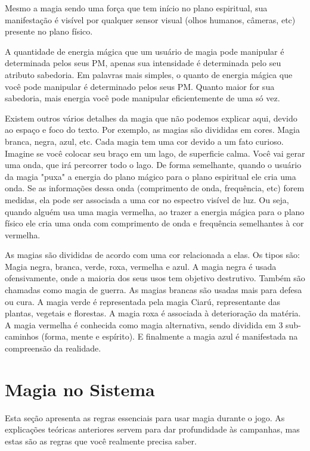 Mesmo a magia sendo uma força que tem início no plano espiritual, sua manifestação é visível por qualquer sensor visual (olhos humanos, câmeras, etc) presente no plano físico.

A quantidade de energia mágica que um usuário de magia pode manipular é determinada pelos seus PM, apenas sua intensidade é determinada pelo seu atributo sabedoria. Em palavras mais simples, o quanto de energia mágica que você pode manipular é determinado pelos seus PM. Quanto maior for sua sabedoria, mais energia você pode manipular eficientemente de uma só vez.

Existem outros vários detalhes da magia que não podemos explicar aqui, devido ao espaço e foco do texto. Por exemplo, as magias são divididas em cores. Magia branca, negra, azul, etc. Cada magia tem uma cor devido a um fato curioso. Imagine se você colocar seu braço em um lago, de superficie calma. Você vai gerar uma onda, que irá percorrer todo o lago. De forma semelhante, quando o usuário da magia "puxa" a energia do plano mágico para o plano espiritual ele cria uma onda. Se as informações dessa onda (comprimento de onda, frequência, etc) forem medidas, ela pode ser associada a uma cor no espectro visível de luz. Ou seja, quando alguém usa uma magia vermelha, ao trazer a energia mágica para o plano físico ele cria uma onda com comprimento de onda e frequência semelhantes à cor vermelha.  


As magias são divididas de acordo com uma cor relacionada a elas. Os tipos são: Magia negra, branca, verde, roxa, vermelha e azul. A magia negra é usada ofensivamente, onde a maioria dos seus usos tem objetivo destrutivo. Também são chamadas como magia de guerra. As magias brancas são usadas mais para defesa ou cura. A magia verde é representada pela magia Ciarú, representante das plantas, vegetais e florestas. A magia roxa é associada à deterioração da matéria. A magia vermelha é conhecida como magia alternativa, sendo dividida em 3 sub-caminhos (forma, mente e espírito). E finalmente a magia azul é manifestada na compreensão da realidade. 

\section{Magia no Sistema}

Esta seção apresenta as regras essenciais para usar magia durante o jogo. As explicações teóricas anteriores servem para dar profundidade às campanhas, mas estas são as regras que você realmente precisa saber.

